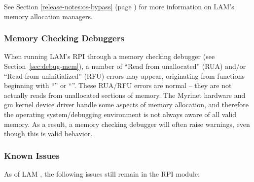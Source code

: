 See Section \ref{release-notes:os-bypass} (page
\pageref{release-notes:os-bypass}) for more information on LAM's
memory allocation managers.


\subsubsection{Memory Checking Debuggers}

When running LAM's  RPI through a memory checking debugger
(see Section~\ref{sec:debug-mem}), a number of ``Read from
unallocated'' (RUA) and/or ``Read from uninitialized'' (RFU) errors
may appear, originating from functions beginning with ``''
or ``''.  These RUA/RFU errors are
normal -- they are not actually reads from unallocated sections of
memory.  The Myrinet hardware and gm kernel device driver handle some
aspects of memory allocation, and therefore the operating
system/debugging environment is not always aware of all valid memory.
As a result, a memory checking debugger will often raise warnings,
even though this is valid behavior.


\subsubsection{Known Issues}

As of LAM \lamversion, the following issues still remain in the
 RPI module:

